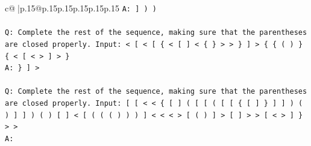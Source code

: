 \documentclass{article}
\begin{document}
{\begin{supertabular}{c@{$\;$}|p{.15\linewidth}@{}p{.15\linewidth}p{.15\linewidth}p{.15\linewidth}p{.15\linewidth}p{.15\linewidth}}
{{{\texttt{A: {]} ) )} \\
\\ 
\texttt{Q: Complete the rest of the sequence, making sure that the parentheses are closed properly. Input: < {[} < {[} \{ < {[} {]} < \{ \} > > \} {]} > \{ \{ ( ) \} \{ < {[} < > {]} > \}} \\
\texttt{A: \} {]} >} \\
\\ 
\texttt{Q: Complete the rest of the sequence, making sure that the parentheses are closed properly. Input: {[} {[} < < \{ {[} {]} ( {[} {[} ( {[} {[} \{ {[} {]} \} {]} {]} ) ( ) {]} {]} ) ( ) {[} {]} < {[} ( ( ( ) ) ) {]} < < < > {[} ( ) {]} > {[} {]} > > {[} < > {]} \} > >} \\
\texttt{A:} \\
            }
        }
    }
     \\ \\


\end{supertabular}}
\end{document}
